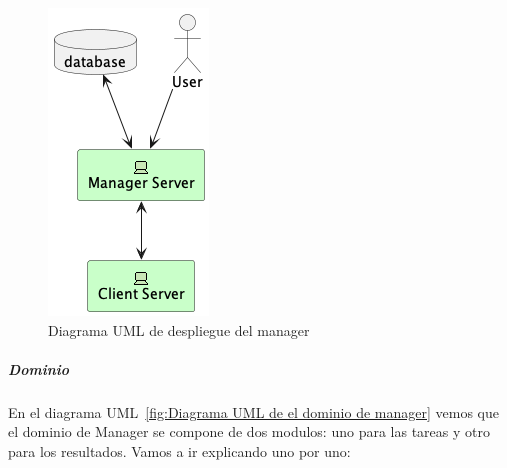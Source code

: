 \begin{figure}[H]
    \centering
    \includegraphics[height=0.4\textheight]{./part/Proyecto_ejecutivo/memoria_descriptiva/descripcionDelProyecto/manager/uml/managerServerConcept}
    \caption{Diagrama UML de despliegue del manager}\label{fig:Diagrama UML de despliegue del manager}
\end{figure}

\subparagraph{Dominio}

En el diagrama UML~\ref{fig:Diagrama UML de el dominio de manager} vemos que el dominio de Manager se compone de dos modulos: uno para las tareas y otro para los resultados. Vamos a ir explicando uno por uno:

